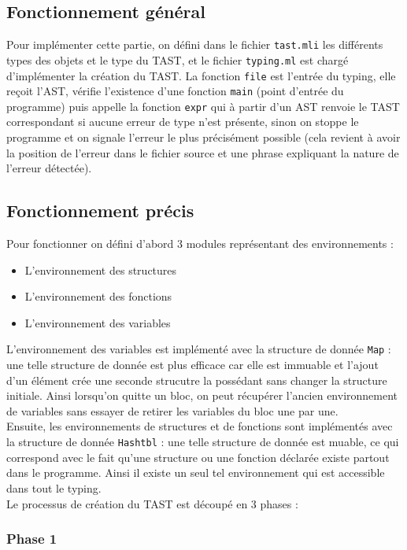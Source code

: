 \documentclass[10pt]{report}
\begin{document}
\subsection{Fonctionnement général}

Pour implémenter cette partie, on défini dans le fichier \verb|tast.mli| les différents types des objets et le type du TAST, et le fichier \verb|typing.ml| est chargé d'implémenter la création du TAST. La fonction \verb|file| est l'entrée du typing, elle reçoit l'AST, vérifie l'existence d'une fonction \verb|main| (point d'entrée du programme) puis appelle la fonction \verb|expr| qui à partir d'un AST renvoie le TAST correspondant si aucune erreur de type n'est présente, sinon on stoppe le programme et on signale l'erreur le plus précisément possible (cela revient à avoir la position de l'erreur dans le fichier source et une phrase expliquant la nature de l'erreur détectée).

\subsection{Fonctionnement précis}

Pour fonctionner on défini d'abord 3 modules représentant des environnements :
\begin{itemize}
  \item L'environnement des structures
  \item L'environnement des fonctions
  \item L'environnement des variables
\end{itemize}
\indent L'environnement des variables est implémenté avec la structure de donnée \verb|Map| : une telle structure de donnée est plus efficace car elle est immuable et l'ajout d'un élément crée une seconde strucutre la possédant sans changer la structure initiale. Ainsi lorsqu'on quitte un bloc, on peut récupérer l'ancien environnement de variables sans essayer de retirer les variables du bloc une par une. \\
\indent Ensuite, les environnements de structures et de fonctions sont implémentés avec la structure de donnée \verb|Hashtbl| : une telle structure de donnée est muable, ce qui correspond avec le fait qu'une structure ou une fonction déclarée existe partout dans le programme. Ainsi il existe un seul tel environnement qui est accessible dans tout le typing. \\
\indent Le processus de création du TAST est découpé en 3 phases :

\subsubsection{Phase 1}
\end{document}
